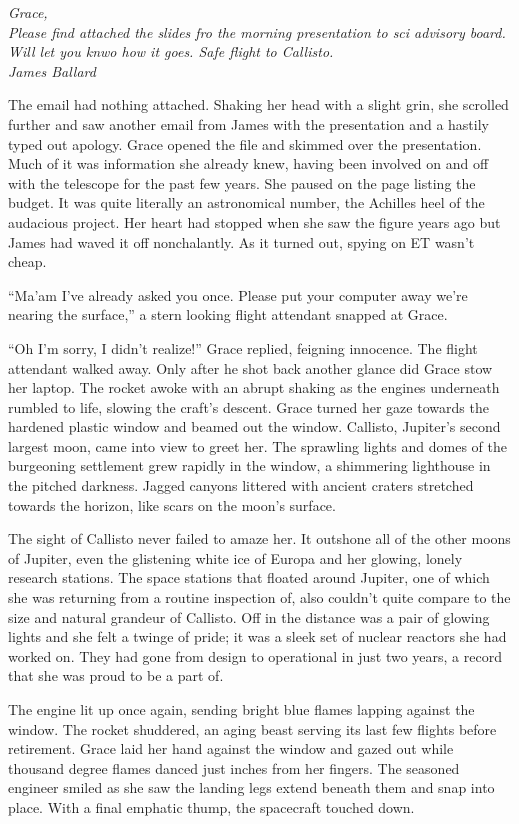 \documentclass[openany, 12pt]{book} %
\begin{document}
\textit{Grace,\\
Please find attached the slides fro the morning presentation to sci advisory board. Will let you knwo how it goes. Safe flight to Callisto.\\
James Ballard}

The email had nothing attached. Shaking her head with a slight grin, she scrolled further and saw another email from James with the presentation and a hastily typed out apology. Grace opened the file and skimmed over the presentation. Much of it was information she already knew, having been involved on and off with the telescope for the past few years. She paused on the page listing the budget. It was quite literally an astronomical number, the Achilles heel of the audacious project. Her heart had stopped when she saw the figure years ago but James had waved it off nonchalantly. As it turned out, spying on ET wasn't cheap.

``Ma'am I've already asked you once. Please put your computer away we're nearing the surface,'' a stern looking flight attendant snapped at Grace.

``Oh I'm sorry, I didn't realize!'' Grace replied, feigning innocence. The flight attendant walked away. Only after he shot back another glance did Grace stow her laptop. The rocket awoke with an abrupt shaking as the engines underneath rumbled to life, slowing the craft's descent. Grace turned her gaze towards the hardened plastic window and beamed out the window. Callisto, Jupiter's second largest moon, came into view to greet her. The sprawling lights and domes of the burgeoning settlement grew rapidly in the window, a shimmering lighthouse in the pitched darkness. Jagged canyons littered with ancient craters stretched towards the horizon, like scars on the moon's surface. 

The sight of Callisto never failed to amaze her. It outshone all of the other moons of Jupiter, even the glistening white ice of Europa and her glowing, lonely research stations. The space stations that floated around Jupiter, one of which she was returning from a routine inspection of, also couldn't quite compare to the size and natural grandeur of Callisto. Off in the distance was a pair of glowing lights and she felt a twinge of pride; it was a sleek set of nuclear reactors she had worked on. They had gone from design to operational in just two years, a record that she was proud to be a part of. 

The engine lit up once again, sending bright blue flames lapping against the window. The rocket shuddered, an aging beast serving its last few flights before retirement. Grace laid her hand against the window and gazed out while thousand degree flames danced just inches from her fingers. The seasoned engineer smiled as she saw the landing legs extend beneath them and snap into place. With a final emphatic thump, the spacecraft touched down. 
\end{document}
